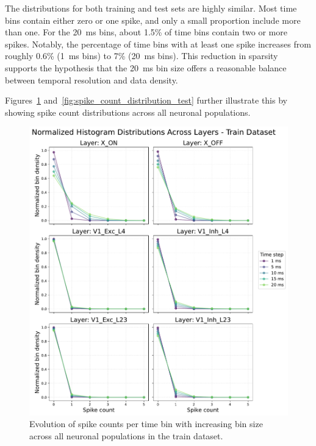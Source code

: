 The distributions for both training and test sets are highly similar. Most time bins contain either zero or one spike, and only a small proportion include more than one. For the 20~ms bins, about 1.5\% of time bins contain two or more spikes. Notably, the percentage of time bins with at least one spike increases from roughly 0.6\% (1~ms bins) to 7\% (20~ms bins). This reduction in sparsity supports the hypothesis that the 20~ms bin size offers a reasonable balance between temporal resolution and data density.

Figures~\ref{fig:spike_count_distribution_train} and~\ref{fig:spike_count_distribution_test} further illustrate this by showing spike count distributions across all neuronal populations.

\begin{figure}
    \centering
    \includegraphics[width=\linewidth]{img/plots/time_step_counts_train.pdf}
    \caption{Evolution of spike counts per time bin with increasing bin size across all neuronal populations in the train dataset.}
    \label{fig:spike_count_distribution_train}
\end{figure}

